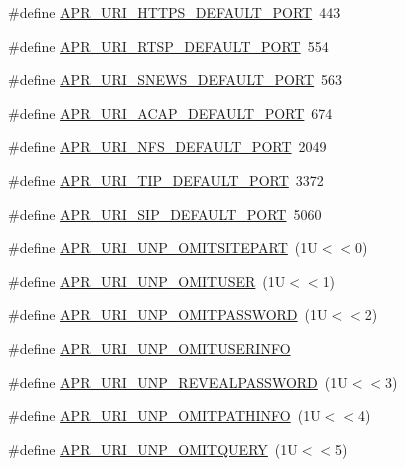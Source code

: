 \begin{DoxyCompactItemize}
\item 
\#define \hyperlink{group__APR__Util__URI_ga9b319ff3bda42c0384fcfe0a2bc53254}{A\+P\+R\+\_\+\+U\+R\+I\+\_\+\+H\+T\+T\+P\+S\+\_\+\+D\+E\+F\+A\+U\+L\+T\+\_\+\+P\+O\+RT}~443
\item 
\#define \hyperlink{group__APR__Util__URI_gab2aac3d460462c664e848203e8046c3b}{A\+P\+R\+\_\+\+U\+R\+I\+\_\+\+R\+T\+S\+P\+\_\+\+D\+E\+F\+A\+U\+L\+T\+\_\+\+P\+O\+RT}~554
\item 
\#define \hyperlink{group__APR__Util__URI_ga6333715b343024de16e20b645beb7634}{A\+P\+R\+\_\+\+U\+R\+I\+\_\+\+S\+N\+E\+W\+S\+\_\+\+D\+E\+F\+A\+U\+L\+T\+\_\+\+P\+O\+RT}~563
\item 
\#define \hyperlink{group__APR__Util__URI_gaf5b775cba93ca7f1778320c33c5a3078}{A\+P\+R\+\_\+\+U\+R\+I\+\_\+\+A\+C\+A\+P\+\_\+\+D\+E\+F\+A\+U\+L\+T\+\_\+\+P\+O\+RT}~674
\item 
\#define \hyperlink{group__APR__Util__URI_ga94dc176de94e729cf565c87cd6db5ffd}{A\+P\+R\+\_\+\+U\+R\+I\+\_\+\+N\+F\+S\+\_\+\+D\+E\+F\+A\+U\+L\+T\+\_\+\+P\+O\+RT}~2049
\item 
\#define \hyperlink{group__APR__Util__URI_ga04b234524306cac26f954abad9a15b46}{A\+P\+R\+\_\+\+U\+R\+I\+\_\+\+T\+I\+P\+\_\+\+D\+E\+F\+A\+U\+L\+T\+\_\+\+P\+O\+RT}~3372
\item 
\#define \hyperlink{group__APR__Util__URI_ga9d9ca5a25b37ad3c41355d902a002622}{A\+P\+R\+\_\+\+U\+R\+I\+\_\+\+S\+I\+P\+\_\+\+D\+E\+F\+A\+U\+L\+T\+\_\+\+P\+O\+RT}~5060
\item 
\#define \hyperlink{group__APR__Util__URI_gaef80da6212c6838ac15bbcafa1e9745b}{A\+P\+R\+\_\+\+U\+R\+I\+\_\+\+U\+N\+P\+\_\+\+O\+M\+I\+T\+S\+I\+T\+E\+P\+A\+RT}~(1\+U$<$$<$0)
\item 
\#define \hyperlink{group__APR__Util__URI_ga93a8095f746bb8d4f4e5d8d6ca102ebc}{A\+P\+R\+\_\+\+U\+R\+I\+\_\+\+U\+N\+P\+\_\+\+O\+M\+I\+T\+U\+S\+ER}~(1\+U$<$$<$1)
\item 
\#define \hyperlink{group__APR__Util__URI_gaed3be741b9a68eb4ee156c6a35b137ff}{A\+P\+R\+\_\+\+U\+R\+I\+\_\+\+U\+N\+P\+\_\+\+O\+M\+I\+T\+P\+A\+S\+S\+W\+O\+RD}~(1\+U$<$$<$2)
\item 
\#define \hyperlink{group__APR__Util__URI_gad573c75c47cc369ffc0a5776c3613494}{A\+P\+R\+\_\+\+U\+R\+I\+\_\+\+U\+N\+P\+\_\+\+O\+M\+I\+T\+U\+S\+E\+R\+I\+N\+FO}
\item 
\#define \hyperlink{group__APR__Util__URI_ga527cd70521f12a7962df9976068dda29}{A\+P\+R\+\_\+\+U\+R\+I\+\_\+\+U\+N\+P\+\_\+\+R\+E\+V\+E\+A\+L\+P\+A\+S\+S\+W\+O\+RD}~(1\+U$<$$<$3)
\item 
\#define \hyperlink{group__APR__Util__URI_ga95d614636f08ee93fbfc341f2ac664c2}{A\+P\+R\+\_\+\+U\+R\+I\+\_\+\+U\+N\+P\+\_\+\+O\+M\+I\+T\+P\+A\+T\+H\+I\+N\+FO}~(1\+U$<$$<$4)
\item 
\#define \hyperlink{group__APR__Util__URI_ga41a4ebcf1930bcbd81aada6e3a06008b}{A\+P\+R\+\_\+\+U\+R\+I\+\_\+\+U\+N\+P\+\_\+\+O\+M\+I\+T\+Q\+U\+E\+RY}~(1\+U$<$$<$5)
\end{DoxyCompactItemize}
